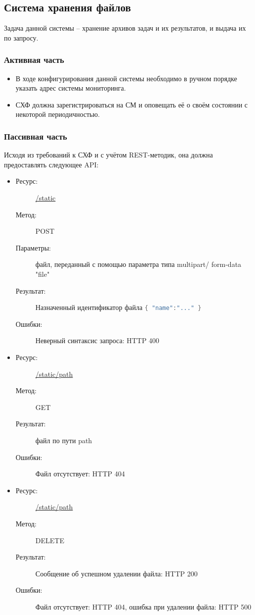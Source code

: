 \documentclass[a4paper,12pt]{report}
\numberwithin{equation}{section}
\begin{document}
  \subsection{Система хранения файлов}
  Задача данной системы -- хранение архивов задач и их результатов, и выдача их по запросу.
  
  \subsubsection{Активная часть}
  \begin{itemize}
    \item В ходе конфигурирования данной системы необходимо в ручном порядке указать адрес системы мониторинга.
    \item СХФ должна зарегистрироваться на СМ и оповещать её о своём состоянии с некоторой периодичностью.
  \end{itemize}
  
  \subsubsection{Пассивная часть}
  Исходя из требований к СХФ и с учётом REST-методик, она должна предоставлять следующее API:
  
  \begin{itemize}
    \item
    \begin{description}
      \item[Ресурс:] \url{/static}
      \item[Метод:] POST
      \item[Параметры:] файл, переданный с помощью параметра типа multipart/ form-data "file"
      \item[Результат:] Назначенный идентификатор файла
      \lstinline[language=Java]|{ "name":"..." }|
      \item[Ошибки:] Неверный синтаксис запроса: HTTP 400
    \end{description}
    \item
    \begin{description}
      \item[Ресурс:] \url{/static/path}
      \item[Метод:] GET
      \item[Результат:] файл по пути path
      \item[Ошибки:] Файл отсутствует: HTTP 404
    \end{description}
    \item
    \begin{description}
      \item[Ресурс:] \url{/static/path}
      \item[Метод:] DELETE
      \item[Результат:] Сообщение об успешном удалении файла: HTTP 200
      \item[Ошибки:] Файл отсутствует: HTTP 404, ошибка при удалении файла: HTTP 500
    \end{description}
  \end{itemize}
  
\end{document}
